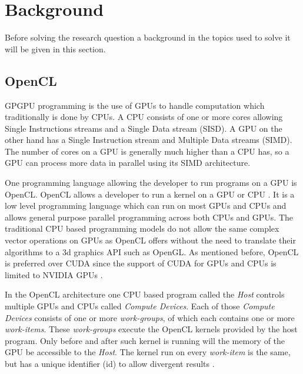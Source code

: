 \section{Background}
Before solving the research question a background in the topics used to solve it will be given in this section.

\subsection{OpenCL}
GPGPU programming is the use of GPUs to handle computation which traditionally is done by CPUs.
A CPU consists of one or more cores allowing Single Instructions streams and a Single Data stream (SISD).
A GPU on the other hand has a Single Instruction stream and Multiple Data streams (SIMD).
The number of cores on a GPU is generally much higher than a CPU has, so a GPU can process more data in parallel using its SIMD architecture.

One programming language allowing the developer to run programs on a GPU is OpenCL.
OpenCL allows a developer to run a kernel on a GPU or CPU \cite{OpenCL}.
It is a low level programming language which can run on most GPUs and CPUs and allows general purpose parallel programming across both CPUs and GPUs.
The traditional CPU based programming models do not allow the same complex vector operations on GPUs as OpenCL offers without the need to translate their algorithms to a 3d graphics API such as OpenGL.
As mentioned before, OpenCL is preferred over CUDA since the support of CUDA for GPUs and CPUs is limited to NVIDIA GPUs \cite{CUDA}.

In the OpenCL architecture one CPU based program call\-ed the \textit{Host} controls multiple GPUs and CPUs called \textit{Compute Devices}.
Each of those \textit{Compute Devices} consists of one or more \textit{work-groups}, of which each contains one or more \textit{work-items}.
These \textit{work-groups} execute the OpenCL kernels provided by the host program.
Only before and after such kernel is running will the memory of the GPU be accessible to the \textit{Host}.
The kernel run on every \textit{work-item} is the same, but has a unique identifier (id) to allow divergent results \cite{OpenCL}.

\begin{comment}
The memory hierarchy used in OpenCL is not equal to that of the physical memory configuration on GPUs.
This is to prevent having to take into account every type of architecture, which would be tedious work as the amount of types is quite large.
Each of the architectural devices discussed above have their own memory, which is inaccessible to components of the same type.
Every processing element can access its own private memory, the memory of its compute unit, the memory of its compute device.
The host memory can be accessed, but it is generally slower than the on-board memory \cite{OpenCL}.

The architecture and memory hierarchy already enforce the division of the algorithm if one wants to use every component of a GPU.
\end{comment}

